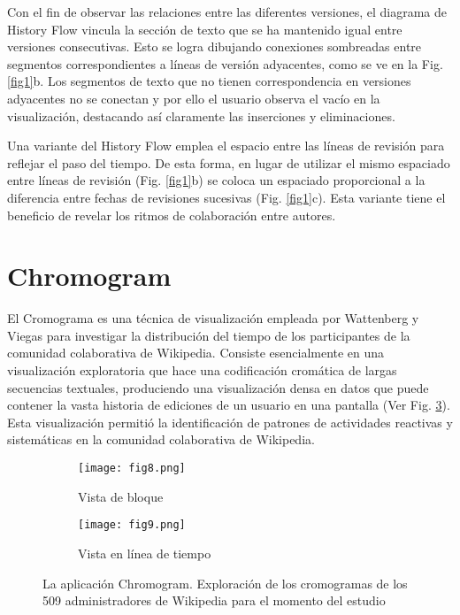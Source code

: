 Con el fin de observar las relaciones entre las diferentes versiones, el diagrama de History Flow vincula la sección de texto que se ha mantenido igual entre versiones consecutivas. Esto se logra dibujando conexiones sombreadas entre segmentos correspondientes a líneas de versión adyacentes, como se ve en la Fig. \ref{fig1}b. Los segmentos de texto que no tienen correspondencia en versiones adyacentes no se conectan y por ello el usuario observa el vacío en la visualización, destacando así claramente las inserciones y eliminaciones.

Una variante del History Flow emplea el espacio entre las líneas de revisión para reflejar el paso del tiempo. De esta forma, en lugar de utilizar el mismo espaciado entre líneas de revisión (Fig. \ref{fig1}b) se coloca un espaciado proporcional a la diferencia entre fechas de revisiones sucesivas (Fig. \ref{fig1}c). Esta variante tiene el beneficio de revelar los ritmos de colaboración entre autores.

\section{Chromogram}
El Cromograma es una técnica de visualización empleada por Wattenberg y Viegas \cite{Wat07} para investigar la distribución del tiempo de los participantes de la comunidad colaborativa de Wikipedia. Consiste esencialmente en una visualización exploratoria que hace una codificación cromática de largas secuencias textuales, produciendo una visualización densa en datos que puede contener la vasta historia de ediciones de un usuario en una pantalla (Ver Fig. \ref{fig8-9}). Esta visualización permitió la identificación de patrones de actividades reactivas y sistemáticas en la comunidad colaborativa de Wikipedia.

\begin{figure}[htp]
  \begin{subfigure}[b]{0.5\textwidth}
    \centering
    \texttt{[image: fig8.png]}
    \caption{Vista de bloque\cite[Fig. 3]{Wat07}}
    \label{fig8}
  \end{subfigure}
  \hfill
  \begin{subfigure}[b]{0.45\textwidth}
    \centering
    \texttt{[image: fig9.png]}
    \caption{Vista en línea de tiempo\cite[Fig. 4]{Wat07}}
    \label{fig9}
  \end{subfigure}
  \caption{La aplicación Chromogram. Exploración de los cromogramas de los 509 administradores de Wikipedia para el momento del estudio}
  \label{fig8-9}
\end{figure}


